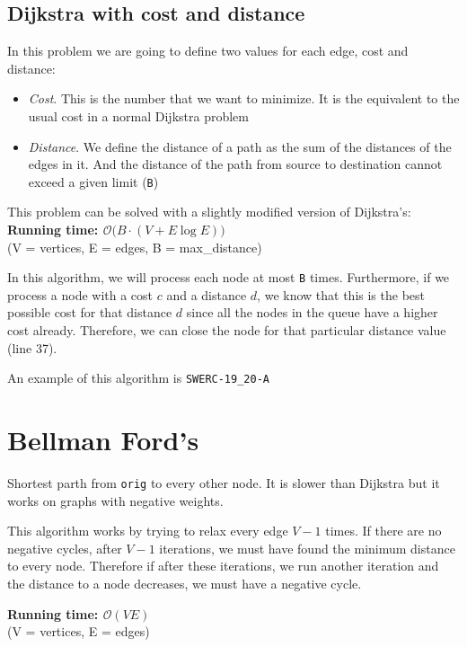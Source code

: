 \subsection{Dijkstra with cost and distance}
\label{graph:dijkstra:distances}
In this problem we are going to define two values for each edge, cost and distance:
\begin{itemize}
	\setlength\itemsep{0 pt}
	\item \textit{Cost}. This is the number that we want to minimize. It is the 
		equivalent to the usual cost in a normal Dijkstra problem
	\item \textit{Distance}. We define the distance of a path as the sum of the
		distances of the edges in it. And the distance of the path from source
		to destination cannot exceed a given limit (\texttt{B})
\end{itemize}
This problem can be solved with a slightly modified version of Dijkstra's:
\noindent \textbf{\boldmath Running time: $\mathcal{O}\big(B\cdot(V+E\log E)\big)$}
\\ {\small(V = vertices, E = edges, B = max\_distance)}

In this algorithm, we will process each node at most \texttt{B} times. Furthermore, 
if we process a node with a cost $c$ and a distance $d$, we know that this is the 
best possible cost for that distance $d$ since all the nodes in the queue have a higher
cost already. Therefore, we can close the node for that particular distance value (line 37).

An example of this algorithm is \texttt{SWERC-19\_20-A}


\section{Bellman Ford's}
Shortest parth from \texttt{orig} to every other node. It is slower than Dijkstra but 
it works on graphs with negative weights. 

This algorithm works by trying to relax every edge $V-1$ times. If there are no 
negative cycles, after $V-1$ iterations, we must have found the minimum distance
to every node. Therefore if after these iterations, we run another
iteration and the distance to a node decreases, we must have a negative cycle.

\noindent \textbf{\boldmath Running time: $\mathcal{O}(VE)$}
\\ {\small(V = vertices, E = edges)}
